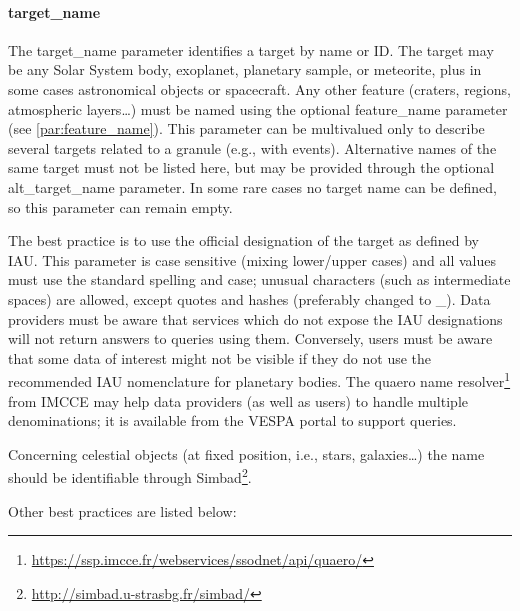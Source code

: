 \documentclass[11pt,a4paper]{ivoa}
\begin{document}
\paragraph{target\_name}

The target\_name parameter identifies a target by name or ID. The
target may be any Solar System body, exoplanet, planetary sample, or
meteorite, plus in some cases astronomical objects or spacecraft. Any
other feature (craters, regions, atmospheric layers\dots) must be named
using the optional feature\_name parameter (see \ref{par:feature_name}). This parameter
can be multivalued only to describe several targets related to a granule
(e.g., with events). Alternative names of the same target must not be
listed here, but may be provided through the optional alt\_target\_name
parameter. In some rare cases no target name can be defined, so this
parameter can remain empty.

The best practice is to use the official designation of the target as
defined by IAU. This parameter is case sensitive (mixing lower/upper
cases) and all values must use the standard spelling and case; unusual
characters (such as intermediate spaces) are allowed, except quotes
and hashes (preferably changed to \_).
Data providers must be aware that services which do not expose the IAU
designations will not return answers to queries using them.
Conversely, users must be aware that some
data of interest might not be visible if they do not use the recommended
IAU nomenclature for planetary bodies. The quaero name
resolver\footnote{\url{https://ssp.imcce.fr/webservices/ssodnet/api/quaero/}}
from IMCCE may help data providers (as well as users) to handle multiple
denominations; it is available from the VESPA portal to support queries.

Concerning celestial objects (at fixed position, i.e., stars,
galaxies…) the name should be identifiable through
Simbad\footnote{\url{http://simbad.u-strasbg.fr/simbad/}}.

Other best practices are listed below:
\end{document}
